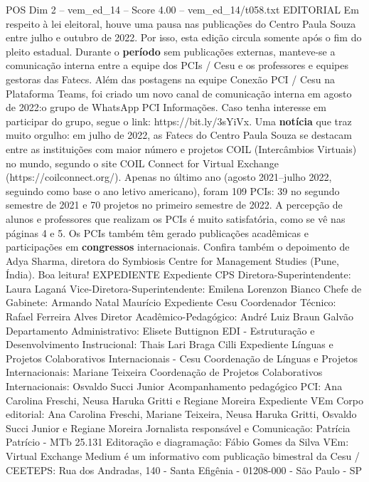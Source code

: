\begin{textsample}{POS Dim 2 – vem\_ed\_14 – Score 4.00 – vem\_ed\_14/t058.txt}  \label{ex:f2_pos_119}
EDITORIAL Em respeito à lei eleitoral, houve uma pausa nas publicações do Centro Paula Souza entre julho e outubro de 2022.
Por isso, esta edição circula somente após o fim do pleito estadual.
Durante o \textbf{período} sem publicações externas, manteve-se a comunicação interna entre a equipe dos PCIs / Cesu e os professores e equipes gestoras das Fatecs.
Além das postagens na equipe Conexão PCI / Cesu na Plataforma Teams, foi criado um novo canal de comunicação interna em agosto de 2022:o grupo de WhatsApp PCI Informações.
Caso tenha interesse em participar do grupo, segue o link: https://bit.ly/3sYiVx.
Uma \textbf{notícia} que traz muito orgulho: em julho de 2022, as Fatecs do Centro Paula Souza se destacam entre as instituições com maior número e projetos COIL (Intercâmbios Virtuais) no mundo, segundo o site COIL Connect for Virtual Exchange (https://coilconnect.org/).
Apenas no último ano (agosto 2021–julho 2022, seguindo como base o ano letivo americano), foram 109 PCIs: 39 no segundo semestre de 2021 e 70 projetos no primeiro semestre de 2022.
A percepção de alunos e professores que realizam os PCIs é muito satisfatória, como se vê nas páginas 4 e 5.
Os PCIs também têm gerado publicações acadêmicas e participações em \textbf{congressos} internacionais.
Confira também o depoimento de Adya Sharma, diretora do Symbiosis Centre for Management Studies (Pune, Índia).
Boa leitura!
EXPEDIENTE Expediente CPS Diretora-Superintendente: Laura Laganá Vice-Diretora-Superintendente: Emilena Lorenzon Bianco Chefe de Gabinete: Armando Natal Maurício Expediente Cesu Coordenador Técnico: Rafael Ferreira Alves Diretor Acadêmico-Pedagógico: André Luiz Braun Galvão Departamento Administrativo: Elisete Buttignon EDI - Estruturação e Desenvolvimento Instrucional: Thais Lari Braga Cilli Expediente Línguas e Projetos Colaborativos Internacionais - Cesu Coordenação de Línguas e Projetos Internacionais: Mariane Teixeira Coordenação de Projetos Colaborativos Internacionais: Osvaldo Succi Junior Acompanhamento pedagógico PCI: Ana Carolina Freschi, Neusa Haruka Gritti e Regiane Moreira Expediente VEm Corpo editorial: Ana Carolina Freschi, Mariane Teixeira, Neusa Haruka Gritti, Osvaldo Succi Junior e Regiane Moreira Jornalista responsável e Comunicação: Patrícia Patrício - MTb 25.131 Editoração e diagramação: Fábio Gomes da Silva VEm: Virtual Exchange Medium é um informativo com publicação bimestral da Cesu / CEETEPS: Rua dos Andradas, 140 - Santa Efigênia - 01208-000 - São Paulo - SP

\end{textsample}

